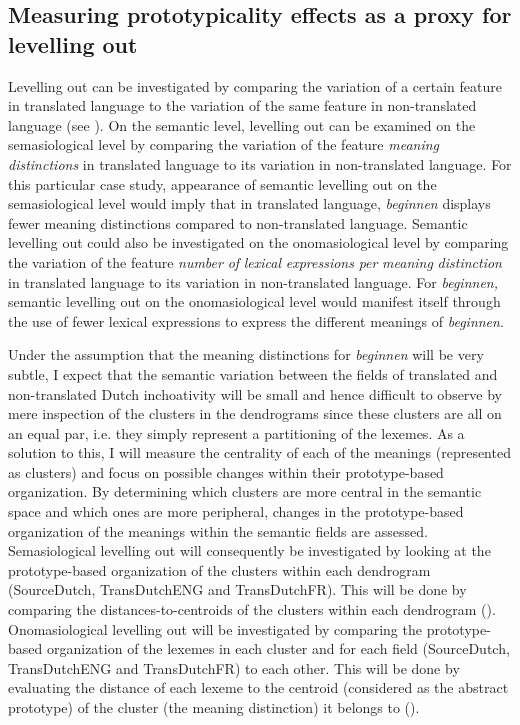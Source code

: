 \subsection{Measuring prototypicality effects as a proxy for levelling out}
\label{sec:3.8.1}
Levelling out can be investigated by comparing the variation of a certain feature in translated language to the variation of the same feature in non-translated language (see ). On the semantic level, levelling out can be examined on the semasiological level by comparing the variation of the feature \textit{meaning} \textit{distinctions} in translated language to its variation in non-translated language. For this particular case study, appearance of semantic levelling out on the semasiological level would imply that in translated language, \textit{beginnen} displays fewer meaning distinctions compared to non-translated language. Semantic levelling out could also be investigated on the onomasiological level by comparing the variation of the feature \textit{number} \textit{of} \textit{lexical} \textit{expressions} \textit{per} \textit{meaning} \textit{distinction} in translated language to its variation in non-translated language. For \textit{beginnen,} semantic levelling out on the onomasiological level would manifest itself through the use of fewer lexical expressions to express the different meanings of \textit{beginnen}.

Under the assumption that the meaning distinctions for \textit{beginnen} will be very subtle, I expect that the semantic variation between the fields of translated and non-translated Dutch inchoativity will be small and hence difficult to observe by mere inspection of the clusters in the dendrograms since these clusters are all on an equal par, i.e. they simply represent a partitioning of the lexemes. As a solution to this, I will measure the centrality of each of the meanings (represented as clusters) and focus on possible changes within their prototype-based organization. By determining which clusters are more central in the semantic space and which ones are more peripheral, changes in the prototype-based organization of the meanings within the semantic fields are assessed. Semasiological levelling out will consequently be investigated by looking at the prototype-based organization of the clusters within each dendrogram (SourceDutch, TransDutchENG and TransDutchFR). This will be done by comparing the distances-to-centroids of the clusters within each dendrogram (). Onomasiological levelling out will be investigated by comparing the prototype-based organization of the lexemes in each cluster and for each field (SourceDutch, TransDutchENG and TransDutchFR) to each other. This will be done by evaluating the distance of each lexeme to the centroid (considered as the abstract prototype) of the cluster (the meaning distinction) it belongs to ().

